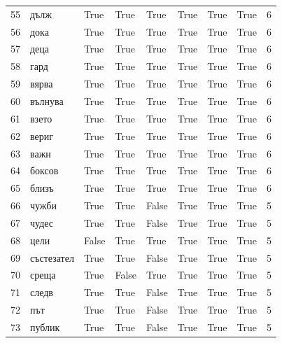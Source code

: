 \begin{longtable}{rlllllllr}
  55 &        дълж &     True &   True &   True &       True &           True &      True &      6 \\
  56 &        дока &     True &   True &   True &       True &           True &      True &      6 \\
  57 &        деца &     True &   True &   True &       True &           True &      True &      6 \\
  58 &        гард &     True &   True &   True &       True &           True &      True &      6 \\
  59 &       вярва &     True &   True &   True &       True &           True &      True &      6 \\
  60 &     вълнува &     True &   True &   True &       True &           True &      True &      6 \\
  61 &       взето &     True &   True &   True &       True &           True &      True &      6 \\
  62 &       вериг &     True &   True &   True &       True &           True &      True &      6 \\
  63 &        важн &     True &   True &   True &       True &           True &      True &      6 \\
  64 &      боксов &     True &   True &   True &       True &           True &      True &      6 \\
  65 &       близъ &     True &   True &   True &       True &           True &      True &      6 \\
  66 &       чужби &     True &   True &  False &       True &           True &      True &      5 \\
  67 &       чудес &     True &   True &  False &       True &           True &      True &      5 \\
  68 &        цели &    False &   True &   True &       True &           True &      True &      5 \\
  69 &  състезател &     True &   True &  False &       True &           True &      True &      5 \\
  70 &       среща &     True &  False &   True &       True &           True &      True &      5 \\
  71 &       следв &     True &   True &  False &       True &           True &      True &      5 \\
  72 &         път &     True &   True &  False &       True &           True &      True &      5 \\
  73 &      публик &     True &   True &  False &       True &           True &      True &      5 \\

\end{longtable}
